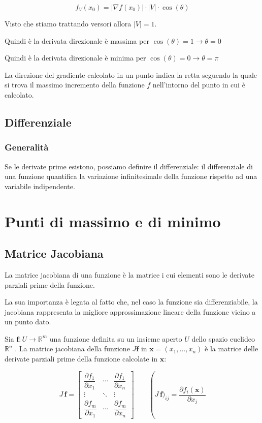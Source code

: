 $$
f_V(x_0)  = |\nabla f(x_0)| \cdot |V| \cdot \cos(\theta)
$$

Visto che stiamo trattando versori allora $|V|=1$.

Quindi è la derivata direzionale è massima per $\cos(\theta)=1 \rightarrow \theta=0$

Quindi è la derivata direzionale è minima per $\cos(\theta)=0 \rightarrow \theta=\pi$

La direzione del gradiente calcolato in un punto indica la retta seguendo la quale si trova il massimo incremento della funzione $f$ nell'intorno del punto in cui è calcolato.

\subsection{Differenziale}

\subsubsection{Generalità}

Se le derivate prime esistono, possiamo definire il differenziale: il differenziale di una funzione quantifica la variazione infinitesimale della funzione rispetto ad una variabile indipendente.


\section{Punti di massimo e di minimo}

\subsection{Matrice Jacobiana}

La matrice jacobiana di una funzione è la matrice i cui elementi sono le derivate parziali prime della funzione.

La sua importanza è legata al fatto che, nel caso la funzione sia differenziabile, la jacobiana rappresenta la migliore approssimazione lineare della funzione vicino a un punto dato.


Sia $\mathbf{f}: U \rightarrow \mathbb R^m$ una funzione definita su un insieme aperto $U$ dello spazio euclideo  $\mathbb R^n$ . La matrice jacobiana della funzione $J {\mathbf f}$ in $\mathbf x = (x_1, \dots, x_n)$ è la matrice delle derivate parziali prime della funzione calcolate in $\mathbf x$:

$$J \, \mathbf f = \begin{bmatrix} \dfrac{\partial f_1}{\partial x_1} & \cdots & \dfrac{\partial f_1}{\partial x_n} \\ \vdots & \ddots & \vdots \\ \dfrac{\partial f_m}{\partial x_1} & \cdots & \dfrac{\partial f_m}{\partial x_n}  \end{bmatrix}\qquad \operatorname (J \, \mathbf f)_{ij} = \frac{\partial f_i (\mathbf {x})}{\partial x_j} $$


